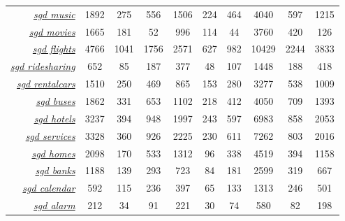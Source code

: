 \documentclass[11pt,a4paper]{article}
\begin{document}
\begin{table}[t]
\begin{tabular}{r|ccc|ccc|ccc}
{\ul \textit{sgd music}}             & 1892           & 275          & 556           & 1506           & 224          & 464           & 4040           & 597          & 1215          \\
{\ul \textit{sgd movies}}            & 1665           & 181          & 52            & 996            & 114          & 44            & 3760           & 420          & 126           \\
{\ul \textit{sgd flights}}           & 4766           & 1041         & 1756          & 2571           & 627          & 982           & 10429          & 2244         & 3833          \\
{\ul \textit{sgd ridesharing}}       & 652            & 85           & 187           & 377            & 48           & 107           & 1448           & 188          & 418           \\
{\ul \textit{sgd rentalcars}}        & 1510           & 250          & 469           & 865            & 153          & 280           & 3277           & 538          & 1009          \\
{\ul \textit{sgd buses}}             & 1862           & 331          & 653           & 1102           & 218          & 412           & 4050           & 709          & 1393          \\
{\ul \textit{sgd hotels}}            & 3237           & 394          & 948           & 1997           & 243          & 597           & 6983           & 858          & 2053          \\
{\ul \textit{sgd services}}          & 3328           & 360          & 926           & 2225           & 230          & 611           & 7262           & 803          & 2016          \\
{\ul \textit{sgd homes}}             & 2098           & 170          & 533           & 1312           & 96           & 338           & 4519           & 394          & 1158          \\
{\ul \textit{sgd banks}}             & 1188           & 139          & 293           & 723            & 84           & 181           & 2599           & 319          & 667           \\
{\ul \textit{sgd calendar}}          & 592            & 115          & 236           & 397            & 65           & 133           & 1313           & 246          & 501           \\
{\ul \textit{sgd alarm}}             & 212            & 34           & 91            & 221            & 30           & 74            & 580            & 82           & 198           \\

\end{tabular}
\end{table}
\end{document}

